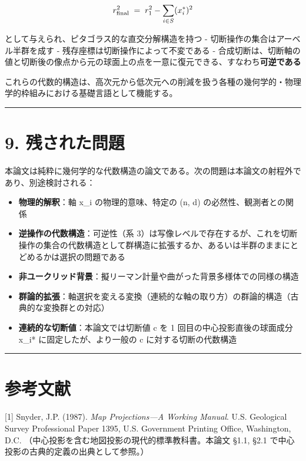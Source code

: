\documentclass[a4paper,11pt]{ltjsarticle}
\theoremstyle{definition}
\theoremstyle{remark}
\providecommand{\tightlist}{%
  \setlength{\itemsep}{0pt}\setlength{\parskip}{0pt}}
\begin{document}
\[
r_{\rm final}^{2} \;=\; r_{1}^{2} - \sum_{i \in S}(x_i^{*})^{2}
\]

として与えられ、ピタゴラス的な直交分解構造を持つ -
切断操作の集合はアーベル半群を成す -
残存座標は切断操作によって不変である -
合成切断は、切断軸の値と切断後の像点から元の球面上の点を一意に復元できる、すなわち\textbf{可逆である}

これらの代数的構造は、高次元から低次元への削減を扱う各種の幾何学的・物理学的枠組みにおける基礎言語として機能する。

\begin{center}\rule{0.5\linewidth}{0.5pt}\end{center}

\section{9. 残された問題}\label{ux6b8bux3055ux308cux305fux554fux984c}

本論文は純粋に幾何学的な代数構造の論文である。次の問題は本論文の射程外であり、別途検討される：

\begin{itemize}
\tightlist
\item
  \textbf{物理的解釈}：軸 x\_i の物理的意味、特定の (n, d)
  の必然性、観測者との関係
\item
  \textbf{逆操作の代数構造}：可逆性（系
  3）は写像レベルで存在するが、これを切断操作の集合の代数構造として群構造に拡張するか、あるいは半群のままにとどめるかは選択の問題である
\item
  \textbf{非ユークリッド背景}：擬リーマン計量や曲がった背景多様体での同様の構造
\item
  \textbf{群論的拡張}：軸選択を変える変換（連続的な軸の取り方）の群論的構造（古典的な変換群との対応）
\item
  \textbf{連続的な切断値}：本論文では切断値 c を 1
  回目の中心投影直後の球面成分 x\_i* に固定したが、より一般の c
  に対する切断の代数構造
\end{itemize}

\begin{center}\rule{0.5\linewidth}{0.5pt}\end{center}

\section{参考文献}\label{ux53c2ux8003ux6587ux732e}

{[}1{]} Snyder, J.P. (1987). \emph{Map Projections---A Working Manual}.
U.S. Geological Survey Professional Paper 1395, U.S. Government Printing
Office, Washington, D.C.
（中心投影を含む地図投影の現代的標準教科書。本論文 §1.1, §2.1
で中心投影の古典的定義の出典として参照。）
\end{document}
